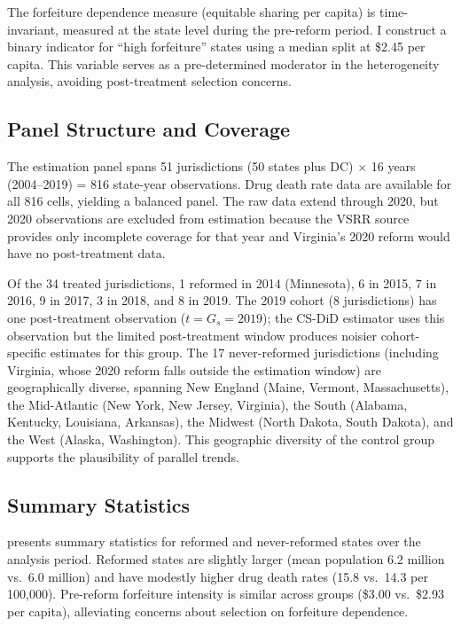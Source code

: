\documentclass[12pt]{article}
\begin{document}
The forfeiture dependence measure (equitable sharing per capita) is time-invariant, measured at the state level during the pre-reform period. I construct a binary indicator for ``high forfeiture'' states using a median split at \$2.45 per capita. This variable serves as a pre-determined moderator in the heterogeneity analysis, avoiding post-treatment selection concerns.

\subsection{Panel Structure and Coverage}

The estimation panel spans 51 jurisdictions (50 states plus DC) $\times$ 16 years (2004--2019) = 816 state-year observations. Drug death rate data are available for all 816 cells, yielding a balanced panel. The raw data extend through 2020, but 2020 observations are excluded from estimation because the VSRR source provides only incomplete coverage for that year and Virginia's 2020 reform would have no post-treatment data.

Of the 34 treated jurisdictions, 1 reformed in 2014 (Minnesota), 6 in 2015, 7 in 2016, 9 in 2017, 3 in 2018, and 8 in 2019. The 2019 cohort (8 jurisdictions) has one post-treatment observation ($t = G_s = 2019$); the CS-DiD estimator uses this observation but the limited post-treatment window produces noisier cohort-specific estimates for this group. The 17 never-reformed jurisdictions (including Virginia, whose 2020 reform falls outside the estimation window) are geographically diverse, spanning New England (Maine, Vermont, Massachusetts), the Mid-Atlantic (New York, New Jersey, Virginia), the South (Alabama, Kentucky, Louisiana, Arkansas), the Midwest (North Dakota, South Dakota), and the West (Alaska, Washington). This geographic diversity of the control group supports the plausibility of parallel trends.

\subsection{Summary Statistics}

 presents summary statistics for reformed and never-reformed states over the analysis period. Reformed states are slightly larger (mean population 6.2 million vs.\ 6.0 million) and have modestly higher drug death rates (15.8 vs.\ 14.3 per 100,000). Pre-reform forfeiture intensity is similar across groups (\$3.00 vs.\ \$2.93 per capita), alleviating concerns about selection on forfeiture dependence.
\end{document}
